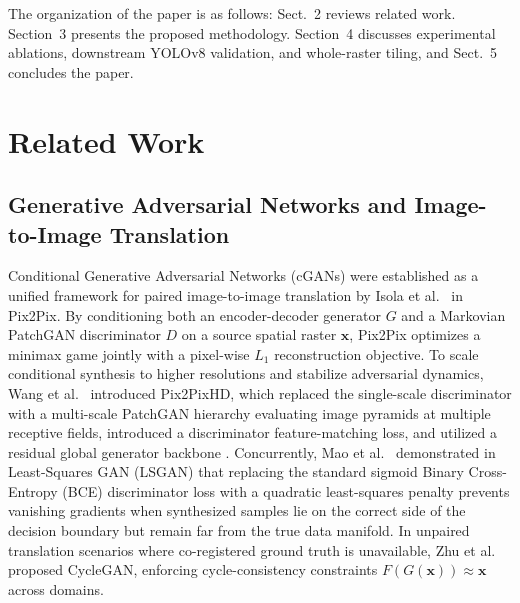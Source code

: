 \documentclass[10pt,a4paper,twoside]{article}
\begin{document}
The organization of the paper is as follows: Sect.~2 reviews related work. Section~3 presents the proposed methodology. Section~4 discusses experimental ablations, downstream YOLOv8 validation, and whole-raster tiling, and Sect.~5 concludes the paper.

\section{Related Work}

\subsection{Generative Adversarial Networks and Image-to-Image Translation}
Conditional Generative Adversarial Networks (cGANs) were established as a unified framework for paired image-to-image translation by Isola et al.~\cite{ref6} in Pix2Pix. By conditioning both an encoder-decoder generator $G$ and a Markovian PatchGAN discriminator $D$ \cite{ref11} on a source spatial raster $\mathbf{x}$, Pix2Pix optimizes a minimax game jointly with a pixel-wise $L_1$ reconstruction objective. To scale conditional synthesis to higher resolutions and stabilize adversarial dynamics, Wang et al.~\cite{ref8} introduced Pix2PixHD, which replaced the single-scale discriminator with a multi-scale PatchGAN hierarchy evaluating image pyramids at multiple receptive fields, introduced a discriminator feature-matching loss, and utilized a residual global generator backbone \cite{ref12}. Concurrently, Mao et al.~\cite{ref13} demonstrated in Least-Squares GAN (LSGAN) that replacing the standard sigmoid Binary Cross-Entropy (BCE) discriminator loss with a quadratic least-squares penalty prevents vanishing gradients when synthesized samples lie on the correct side of the decision boundary but remain far from the true data manifold. In unpaired translation scenarios where co-registered ground truth is unavailable, Zhu et al.~\cite{ref14} proposed CycleGAN, enforcing cycle-consistency constraints $F(G(\mathbf{x})) \approx \mathbf{x}$ across domains.
\end{document}
